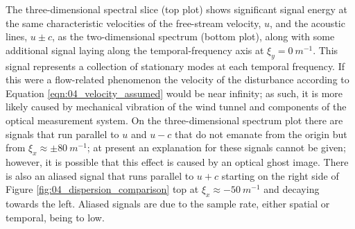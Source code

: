 The three-dimensional spectral slice (top plot) shows significant signal energy at the same characteristic velocities of the free-stream velocity, $u$, and the acoustic lines, $u\pm c$, as the two-dimensional spectrum (bottom plot), along with some additional signal laying along the temporal-frequency axis at $\xi_y=0\ m^{-1}$.
This signal represents a collection of stationary modes at each temporal frequency.
If this were a flow-related phenomenon the velocity of the disturbance according to Equation \ref{eqn:04_velocity_assumed} would be near infinity; as such, it is more likely caused by mechanical vibration of the wind tunnel and components of the optical measurement system.
On the three-dimensional spectrum plot there are signals that run parallel to $u$ and $u-c$ that do not emanate from the origin but from $\xi_x\approx\pm80\ m^{-1}$; at present an explanation for these signals cannot be given; however, it is possible that this effect is caused by an optical ghost image.
There is also an aliased signal that runs parallel to $u+c$ starting on the right side of Figure \ref{fig:04_dispersion_comparison} top at $\xi_x\approx-50\ m^{-1}$ and decaying towards the left.
Aliased signals are due to the sample rate, either spatial or temporal, being to low.

